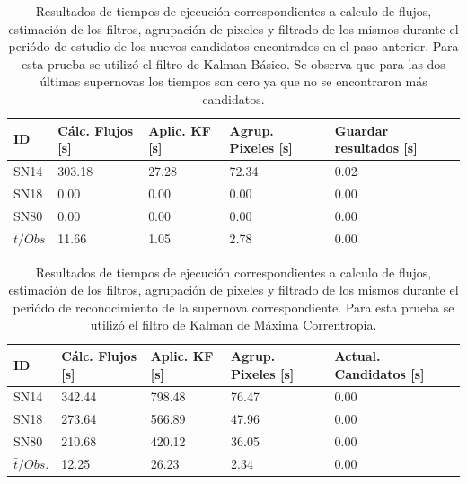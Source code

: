 \begin{table}[h!]
\centering
\begin{tabular}{|l|l|l|l|l|}
\hline
\textbf{ID} & \textbf{C\'alc. Flujos [s]} & \textbf{Aplic. KF [s]} &  \textbf{Agrup. Pixeles [s]}  & \textbf{Guardar resultados [s]}\\ \hline \hline
SN14        & 303.18            & 27.28        &  72.34 & 0.02 \\ \hline
SN18            & 0.00             & 0.00         &  0.00  & 0.00\\ \hline
SN80            & 0.00             & 0.00         &   0.00 & 0.00 \\ \hline\hline 
$\bar{t}/Obs$ & 11.66 &  1.05 & 2.78 & 0.00\\\hline 
\end{tabular}
\label{tab:t2}
\caption{Resultados de tiempos de ejecuci\'on correspondientes a calculo de flujos, estimaci\'on de los filtros, agrupaci\'on de pixeles y filtrado de los mismos durante el peri\'odo de estudio de los nuevos candidatos encontrados en el paso anterior. Para esta prueba se utiliz\'o el filtro de Kalman B\'asico. Se observa que para las dos \'ultimas supernovas los tiempos son cero ya que no se encontraron m\'as candidatos.}
\end{table}


\begin{table}[h!]
\centering
\begin{tabular}{|l|l|l|l|l|}
\hline
\textbf{ID} & \textbf{C\'alc. Flujos [s]} & \textbf{Aplic. KF [s]} &  \textbf{Agrup. Pixeles [s]}  & \textbf{Actual. Candidatos [s]}\\ \hline \hline
SN14        & 342.44            & 798.48        &  76.47 & 0.00 \\ \hline
SN18            & 273.64             & 566.89         &  47.96  & 0.00\\ \hline
SN80            & 210.68             & 420.12         &   36.05 & 0.00 \\ \hline \hline 
$\bar{t}/Obs. $& 12.25 & 26.23 & 2.34 & 0.00\\\hline 
\end{tabular}
\label{tab:t3}
\caption{Resultados de tiempos de ejecuci\'on correspondientes a calculo de flujos, estimaci\'on de los filtros, agrupaci\'on de pixeles y filtrado de los mismos durante el peri\'odo de reconocimiento de la supernova correspondiente. Para esta prueba se utiliz\'o el filtro de Kalman de M\'axima Correntrop\'ia.}
\end{table}

